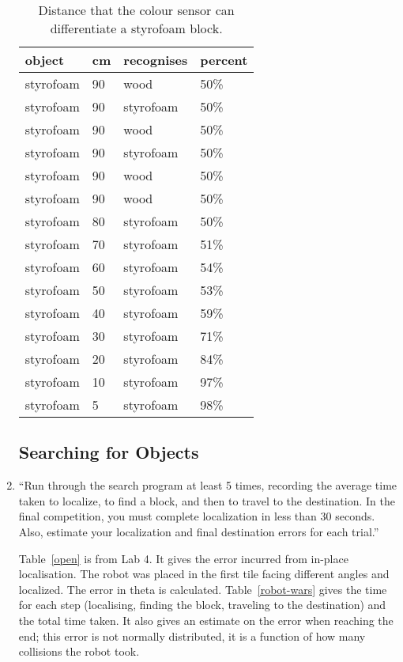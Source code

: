 \documentclass[twocolumn]{article}
\begin{document}
\begin{enumerate}
\begin{table*}[htb]\footnotesize
\begin{center}\begin{tabular}{llll}
object& cm& recognises& percent \\
\hline
styrofoam& 90& wood& 50\% \\
styrofoam& 90& styrofoam& 50\% \\
styrofoam& 90& wood& 50\% \\
styrofoam& 90& styrofoam& 50\% \\
styrofoam& 90& wood& 50\% \\
styrofoam& 90& wood& 50\% \\
styrofoam& 80& styrofoam& 50\% \\
styrofoam& 70& styrofoam& 51\% \\
styrofoam& 60& styrofoam& 54\% \\
styrofoam& 50& styrofoam& 53\% \\
styrofoam& 40& styrofoam& 59\% \\
styrofoam& 30& styrofoam& 71\% \\
styrofoam& 20& styrofoam& 84\% \\
styrofoam& 10& styrofoam& 97\% \\
styrofoam&  5& styrofoam& 98\% \\
\end{tabular}\end{center}
\caption{Distance that the colour sensor can differentiate a styrofoam block.}
\label{styrofoam}
\end{table*}

\subsection{Searching for Objects}

\item
``Run through the search program at least 5 times, recording the average time taken to localize, to find a block, and then to travel to the destination. In the final competition, you must complete localization in less than 30 seconds. Also, estimate your localization and final destination errors for each trial.\cite{lab5}''

Table~\ref{open} is from Lab 4\cite{alexneil4}. It gives the error incurred from in-place localisation. The robot was placed in the first tile facing different angles and localized. The error in theta is calculated. Table~\ref{robot-wars} gives the time for each step (localising, finding the block, traveling to the destination) and the total time taken. It also gives an estimate on the error when reaching the end; this error is not normally distributed, it is a function of how many collisions the robot took.


\end{enumerate}
\end{document}
